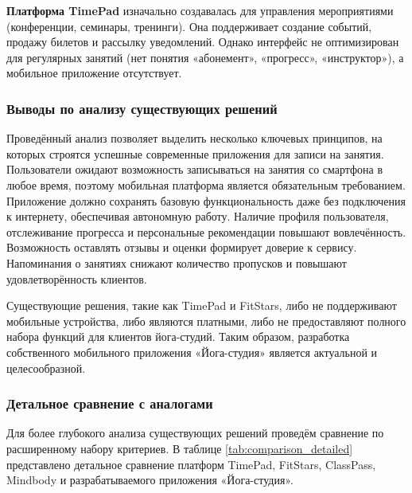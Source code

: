 \textbf{Платформа TimePad} изначально создавалась для управления мероприятиями (конференции, семинары, тренинги). Она поддерживает создание событий, продажу билетов и рассылку уведомлений. Однако интерфейс не оптимизирован для регулярных занятий (нет понятия «абонемент», «прогресс», «инструктор»), а мобильное приложение отсутствует.

\subsubsection{Выводы по анализу существующих решений}

Проведённый анализ позволяет выделить несколько ключевых принципов, на которых строятся успешные современные приложения для записи на занятия. Пользователи ожидают возможность записываться на занятия со смартфона в любое время, поэтому мобильная платформа является обязательным требованием. Приложение должно сохранять базовую функциональность даже без подключения к интернету, обеспечивая автономную работу. Наличие профиля пользователя, отслеживание прогресса и персональные рекомендации повышают вовлечённость. Возможность оставлять отзывы и оценки формирует доверие к сервису. Напоминания о занятиях снижают количество пропусков и повышают удовлетворённость клиентов.

Существующие решения, такие как TimePad и FitStars, либо не поддерживают мобильные устройства, либо являются платными, либо не предоставляют полного набора функций для клиентов йога-студий. Таким образом, разработка собственного мобильного приложения «Йога-студия» является актуальной и целесообразной.


\subsubsection{Детальное сравнение с аналогами}

Для более глубокого анализа существующих решений проведём сравнение по расширенному набору критериев. В таблице \ref{tab:comparison_detailed} представлено детальное сравнение платформ TimePad, FitStars, ClassPass, Mindbody и разрабатываемого приложения «Йога-студия».

